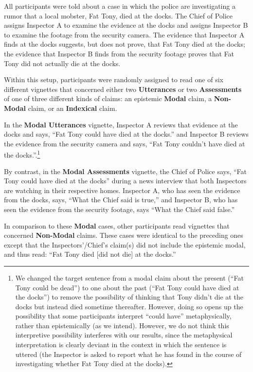 \documentclass[11pt]{article}
\begin{document}
\begin{doublespace}
All participants were told about a case in which the police are investigating a rumor that a local mobster, Fat Tony, died at the docks. The Chief of Police assigns Inspector A to examine the evidence at the docks and assigns Inspector B to examine the footage from the security camera. The evidence that Inspector A finds at the docks suggests, but does not prove, that Fat Tony died at the docks; the evidence that Inspector B finds from the security footage proves that Fat Tony did not actually die at the docks.

Within this setup, participants were randomly assigned to read one of six different vignettes that concerned either two {\bf Utterances} or two {\bf Assessments} of one of three different kinds of claims: an epistemic \textbf{Modal} claim, a \textbf{Non-Modal} claim, or an \textbf{Indexical} claim.

In the {\bf Modal Utterances} vignette, Inspector A reviews that evidence at the docks and says, ``Fat Tony could have died at the docks.'' and Inspector B reviews the evidence from the security camera and says, ``Fat Tony couldn't have died at the docks.''.\footnote{We changed the target sentence from a modal claim about the present (``Fat Tony could be dead'') to one about the past (``Fat Tony could have died at the docks'') to remove the possibility of thinking that Tony didn't die at the docks but instead died sometime thereafter. However, doing so opens up the possibility that some participants interpret ``could have'' metaphysically, rather than epistemically (as we intend). However, we do not think this interpretive possibility interferes with our results, since the metaphysical interpretation is clearly deviant in the context in which the sentence is uttered (the Inspector is asked to report what he has found in the course of investigating whether Fat Tony died at the docks).}

By contrast, in the {\bf Modal Assessments} vignette, the Chief of Police says, ``Fat Tony could have died at the docks'' during a news interview that both Inspectors are watching in their respective homes. Inspector A, who has seen the evidence from the docks, says, ``What the Chief said is true,'' and Inspector B, who has seen the evidence from the security footage, says ``What the Chief said false.'' 

In comparison to these \textbf{Modal} cases, other participants read vignettes that concerned \textbf{Non-Modal} claims. These cases were identical to the preceding ones except that the Inspectors'/Chief's claim(s) did not include the epistemic modal, and thus read: ``Fat Tony died [did not die] at the docks.''


\end{doublespace}
\end{document}

